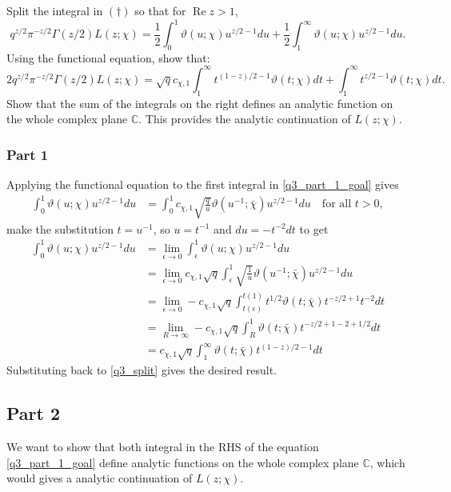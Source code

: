 \documentclass{article}
\theoremstyle{definition}
\theoremstyle{definition}
\theoremstyle{remark}
\begin{document}
Split the integral in $(\dagger)$ so that for $\operatorname{Re} z > 1$,
\begin{equation}\label{q3_split}
    q^{z/2}\pi^{-z/2}\Gamma(z/2)L(z;\chi) = \frac{1}{2} \int_0^1 \vartheta(u;\chi) u^{z/2-1} du + \frac{1}{2} \int_1^{\infty} \vartheta(u;\chi) u^{z/2-1} du.
\end{equation}
Using the functional equation, show that:
\begin{equation}\label{q3_part_1_goal}
    2q^{z/2}\pi^{-z/2}\Gamma(z/2)L(z;\chi) = \sqrt{q} c_{\chi,1} \int_1^{\infty} t^{(1-z)/2-1}\vartheta(t;\chi) dt + \int_1^{\infty} t^{z/2-1}\vartheta(t;\chi) dt.
\end{equation}
Show that the sum of the integrals on the right defines an analytic function on the whole complex plane $\mathbb{C}$. This provides the analytic continuation of $L(z;\chi)$.

\subsubsection*{Part 1}
Applying the functional equation to the first integral in \eqref{q3_part_1_goal} gives
\begin{align}
	\int_0^1 \vartheta(u;\chi) u^{z/2-1} du 
	&= \int_0^1 c_{\chi,1} \sqrt{\frac{q}{u}} \vartheta(u^{-1};\bar{\chi})u^{z/2 - 1} du \quad \text{for all } t > 0, 
\end{align}
make the substitution $t = u^{-1}$, so $u = t^{-1}$ and $du = -t^{-2}dt$ to get 
\begin{align}
	\int_0^1 \vartheta(u;\chi) u^{z/2-1} du 
	& = \lim_{\epsilon \rightarrow 0} \int_{\epsilon}^1 \vartheta(u;\chi) u^{z/2-1} du \\ 
	&= \lim_{\epsilon \rightarrow  0} c_{\chi,1} \sqrt{q} \int_{\epsilon}^{1} 
	\sqrt{\frac{1}{u}} \vartheta(u^{-1};\bar{\chi})u^{z/2 - 1} du
	\\ 
	&= \lim_{\epsilon \rightarrow  0} - c_{\chi,1} \sqrt{q} \int_{t(\epsilon)}^{t(1)} 
	t^{1/2} \vartheta(t;\bar{\chi})t^{-z/2 + 1} t^{-2}  dt
	\\ 
	&= \lim_{R \rightarrow  \infty} - c_{\chi,1} \sqrt{q} \int_{R}^{1} 
	 \vartheta(t;\bar{\chi})t^{-z/2 + 1 -2 + 1/2} dt
	\\ 
	&=  c_{\chi,1} \sqrt{q} \int^{\infty}_{1} 
	 \vartheta(t;\bar{\chi})t^{(1-z)/2 - 1} dt
\end{align}
Substituting back to \eqref{q3_split} gives the desired result.


\subsection*{Part 2}
We want to show that both integral in the RHS of the equation \eqref{q3_part_1_goal} define analytic functions on the whole complex plane $\mathbb{C}$, which would gives a analytic continuation of $L(z;\chi)$.
\end{document}
